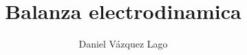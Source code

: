 \documentclass[10pt,a4paper]{article}
\author{Daniel Vázquez Lago}
\begin{document}
\title{Balanza electrodinamica}
\maketitle \newpage
\tableofcontents \newpage
\end{document}
